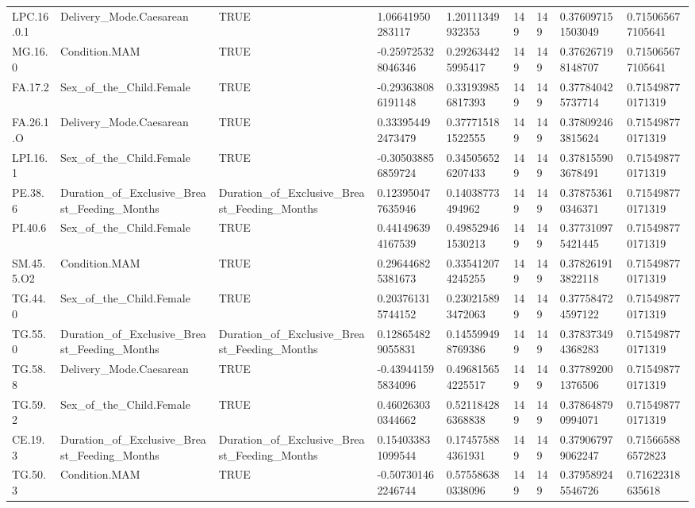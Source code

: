\begin{longtable}{lllllllll}
LPC.16.0.1 & Delivery\_Mode.Caesarean & TRUE & 1.06641950283117 & 1.20111349932353 & 149 & 149 & 0.376097151503049 & 0.715065677105641 \\
MG.16.0 & Condition.MAM & TRUE & -0.259725328046346 & 0.292634425995417 & 149 & 149 & 0.376267198148707 & 0.715065677105641 \\
FA.17.2 & Sex\_of\_the\_Child.Female & TRUE & -0.293638086191148 & 0.331939856817393 & 149 & 149 & 0.377840425737714 & 0.715498770171319 \\
FA.26.1.O & Delivery\_Mode.Caesarean & TRUE & 0.333954492473479 & 0.377715181522555 & 149 & 149 & 0.378092463815624 & 0.715498770171319 \\
LPI.16.1 & Sex\_of\_the\_Child.Female & TRUE & -0.305038856859724 & 0.345056526207433 & 149 & 149 & 0.378155903678491 & 0.715498770171319 \\
PE.38.6 & Duration\_of\_Exclusive\_Breast\_Feeding\_Months & Duration\_of\_Exclusive\_Breast\_Feeding\_Months & 0.123950477635946 & 0.14038773494962 & 149 & 149 & 0.378753610346371 & 0.715498770171319 \\
PI.40.6 & Sex\_of\_the\_Child.Female & TRUE & 0.441496394167539 & 0.498529461530213 & 149 & 149 & 0.377310975421445 & 0.715498770171319 \\
SM.45.5.O2 & Condition.MAM & TRUE & 0.296446825381673 & 0.335412074245255 & 149 & 149 & 0.378261913822118 & 0.715498770171319 \\
TG.44.0 & Sex\_of\_the\_Child.Female & TRUE & 0.203761315744152 & 0.230215893472063 & 149 & 149 & 0.377584724597122 & 0.715498770171319 \\
TG.55.0 & Duration\_of\_Exclusive\_Breast\_Feeding\_Months & Duration\_of\_Exclusive\_Breast\_Feeding\_Months & 0.128654829055831 & 0.145599498769386 & 149 & 149 & 0.378373494368283 & 0.715498770171319 \\
TG.58.8 & Delivery\_Mode.Caesarean & TRUE & -0.439441595834096 & 0.496815654225517 & 149 & 149 & 0.377892001376506 & 0.715498770171319 \\
TG.59.2 & Sex\_of\_the\_Child.Female & TRUE & 0.460263030344662 & 0.521184286368838 & 149 & 149 & 0.378648790994071 & 0.715498770171319 \\
CE.19.3 & Duration\_of\_Exclusive\_Breast\_Feeding\_Months & Duration\_of\_Exclusive\_Breast\_Feeding\_Months & 0.154033831099544 & 0.174575884361931 & 149 & 149 & 0.379067979062247 & 0.715665886572823 \\
TG.50.3 & Condition.MAM & TRUE & -0.507301462246744 & 0.575586380338096 & 149 & 149 & 0.379589245546726 & 0.71622318635618 \\

\end{longtable}
